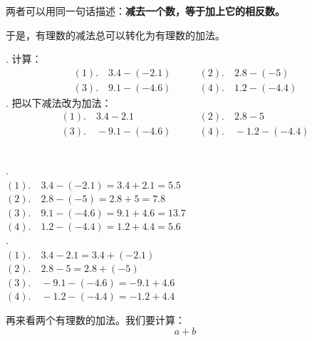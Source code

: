 \documentclass[12pt,UTF8,fontset=none]{ctexbook}
\begin{document}
两者可以用同一句话描述：\textbf{减去一个数，等于加上它的相反数。}

\begin{center}
\end{center}

于是，有理数的减法总可以转化为有理数的加法。

\begin{ex}
    . 计算：
    $$
    \begin{array}{ll}
        (1). \quad 3.4 - (-2.1) \quad & \quad (2). \quad 2.8 - (-5) \\
        (3). \quad 9.1 - (-4.6) \quad & \quad (4). \quad 1.2 - (-4.4) 
    \end{array}
    $$
    . 把以下减法改为加法：
    $$
    \begin{array}{ll}
        (1). \quad 3.4 - 2.1 \quad & \quad (2). \quad 2.8 - 5 \\
        (3). \quad -9.1 - (-4.6) \quad & \quad (4). \quad -1.2 - (-4.4) 
    \end{array}
    $$

\end{ex}
\begin{so}
    \mbox{}\\
    . \\
    \indent $(1). \quad 3.4 - (-2.1) = 3.4 + 2.1 = 5.5$ \\
    \indent $(2). \quad 2.8 - (-5) = 2.8 + 5 = 7.8$ \\
    \indent $(3). \quad 9.1 - (-4.6) = 9.1 + 4.6 = 13.7$ \\
    \indent $(4). \quad 1.2 - (-4.4) = 1.2 + 4.4 = 5.6$ \\
    . \\
    \indent $(1). \quad 3.4 - 2.1 = 3.4 + (-2.1)$ \\
    \indent $(2). \quad 2.8 - 5 = 2.8 + (-5)$ \\
    \indent $(3). \quad -9.1 - (-4.6) = -9.1 + 4.6$ \\
    \indent $(4). \quad -1.2 - (-4.4) = -1.2 + 4.4$ 
\end{so}

再来看两个有理数的加法。我们要计算：
$$ a + b $$
\end{document}
